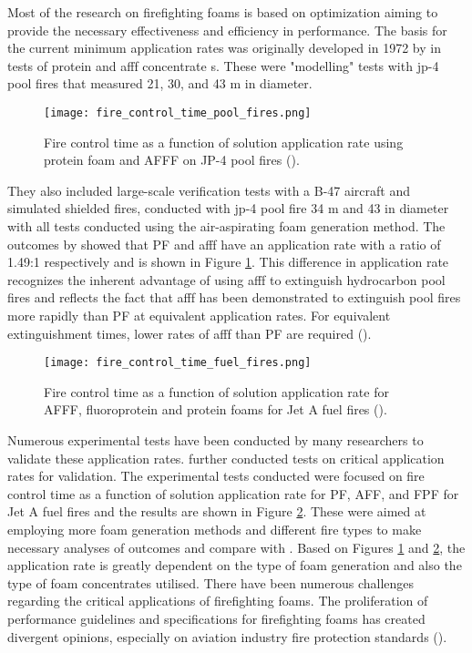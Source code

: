Most of the research on firefighting foams is based on optimization aiming to provide the necessary effectiveness and efficiency in performance. The basis for the current minimum application rates was originally developed in 1972 by \cite{geyer1972evaluation} in tests of protein and \acrshort{afff} concentrate s. These were "modelling" tests with \acrfull{jp-4} pool fires that measured 21, 30, and 43 m in diameter. 

\begin{figure}[H]
    \centering
    \texttt{[image: fire\_control\_time\_pool\_fires.png]}
    \caption{Fire control time as a function of solution application rate using protein foam and AFFF on JP-4 pool fires (\cite{geyer1972evaluation}).}
    \label{ch2:figure:pool}
\end{figure}
They also included large-scale verification tests with a B-47 aircraft and simulated shielded fires, conducted with \acrshort{jp-4} pool fire 34 m and 43 in diameter with all tests conducted using the air-aspirating foam generation method. The outcomes by \cite{geyer1972evaluation} showed that PF and \acrshort{afff} have an application rate with a ratio of 1.49:1 respectively and is shown in Figure \ref{ch2:figure:pool}. This difference in application rate recognizes the inherent advantage of using \acrshort{afff} to extinguish hydrocarbon pool fires and reflects the fact that \acrshort{afff} has been demonstrated to extinguish pool fires more rapidly than PF at equivalent application rates. For equivalent extinguishment times, lower rates of \acrshort{afff} than PF are required (\cite{scheffey1995evaluating}).

\begin{figure}[H]
    \centering
    \texttt{[image: fire\_control\_time\_fuel\_fires.png]}
    \caption{Fire control time as a function of solution application rate for AFFF, fluoroprotein and protein foams for Jet A fuel fires (\cite{geyer1972evaluation}).}
    \label{ch2:figure:fuel}
\end{figure}

Numerous experimental tests have been conducted by many researchers to validate these application rates. \cite{geyer1979comparative} further conducted tests on critical application rates for validation. The experimental tests conducted were focused on fire control time as a function of solution application rate for PF, AFF, and FPF for Jet A fuel fires and the results are shown in Figure \ref{ch2:figure:fuel}. These were aimed at employing more foam generation methods and different fire types to make necessary analyses of outcomes and compare with \cite{geyer1972evaluation}. Based on Figures \ref{ch2:figure:pool} and \ref{ch2:figure:fuel}, the application rate is greatly dependent on the type of foam generation and also the type of foam concentrates utilised. There have been numerous challenges regarding the critical applications of firefighting foams. The proliferation of performance guidelines and specifications for firefighting foams has created divergent opinions, especially on aviation industry fire protection standards (\cite{scheffey1995evaluating}).



